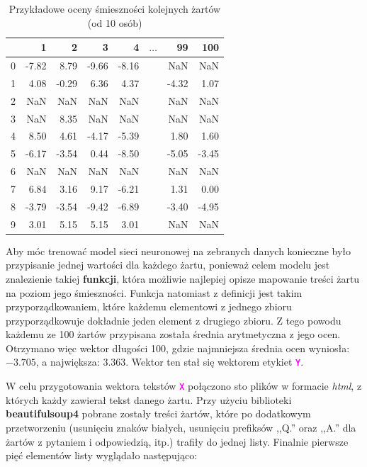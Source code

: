 \documentclass{article}
\newcommand{\code}[1]{\textcolor{Fuchsia}{\textbf{\texttt{#1}}}}
\begin{document}
    \begin{table}[!htbp]%
        \centering
        \begin{tabular}{l|rrrrcrr}
             & 1 & 2 & 3 & 4 & $\dots$ & 99 & 100 \\ \hline
            0 & -7.82 & 8.79 & -9.66 & -8.16 & & NaN & NaN \\
            1 & 4.08 & -0.29 & 6.36 & 4.37 & & -4.32 & 1.07 \\
            2 & NaN & NaN & NaN & NaN & & NaN & NaN \\
            3 & NaN & 8.35 & NaN & NaN & & NaN & NaN \\
            4 & 8.50 & 4.61 & -4.17 & -5.39 & & 1.80 & 1.60 \\
            5 & -6.17 & -3.54 & 0.44 & -8.50 & & -5.05 & -3.45 \\
            6 & NaN & NaN & NaN & NaN & & NaN & NaN \\
            7 & 6.84 & 3.16 & 9.17 & -6.21 & & 1.31 & 0.00 \\
            8 & -3.79 & -3.54 & -9.42 & -6.89 & & -3.40 & -4.95 \\
            9 & 3.01 & 5.15 & 5.15 & 3.01 & & NaN & NaN \\
        \end{tabular}
        \caption{Przykładowe oceny śmieszności kolejnych żartów (od 10 osób)}
        \label{tab:example_ratings}
    \end{table}

\noindent Aby móc trenować model sieci neuronowej na zebranych danych konieczne było przypisanie jednej wartości dla każdego żartu, ponieważ celem modelu jest znalezienie takiej \textbf{funkcji}, która możliwie najlepiej opisze mapowanie treści żartu na poziom jego śmieszności. Funkcja natomiast z definicji jest takim przyporządkowaniem, które każdemu elementowi z jednego zbioru przyporządkowuje dokładnie jeden element z drugiego zbioru. Z tego powodu każdemu ze 100 żartów przypisana została średnia arytmetyczna z jego ocen. Otrzymano więc wektor długości 100, gdzie najmniejsza średnia ocen wyniosła: $-3.705$, a największa: $3.363$. Wektor ten stał się wektorem etykiet \code{Y}.

\vspace{0.2cm}

\noindent W celu przygotowania wektora tekstów \code{X} połączono sto plików w formacie \textit{html}, z których każdy zawierał tekst danego żartu. Przy użyciu biblioteki \textbf{beautifulsoup4} pobrane zostały treści żartów, które po dodatkowym przetworzeniu (usunięciu znaków białych, usunięciu prefiksów ,,Q.'' oraz ,,A.'' dla żartów z pytaniem i odpowiedzią, itp.) trafiły do jednej listy. Finalnie pierwsze pięć elementów listy wyglądało następująco:
\end{document}
